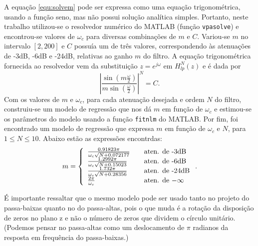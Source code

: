 A equação \ref{equ:solvem} pode ser expressa como uma equação trigonométrica, usando a função seno, mas não possui solução analítica simples. Portanto, neste trabalho utilizou-se o resolvedor numérico do MATLAB (função \texttt{vpasolve}) e encontrou-se valores de $\omega_c$ para diversas combinações de $m$ e $C$. Variou-se $m$ no intervalo $[2,200]$ e $C$ possuía um de três valores, correspondendo às atenuações de -3dB, -6dB e -24dB, relativas ao ganho $m$ do filtro. A equação trigonométrica fornecida ao resolvedor vem da substituição $z=e^{j\omega}$ em $H^N_{lp}(z)$ e é dada por
\begin{equation}
     \left|\frac{\sin \left(m\frac{\omega}{2}\right)} {m\sin\left(\frac{\omega}{2}\right)}\right|^N = C.
\end{equation}
Com os valores de $m$ e $\omega_c$, para cada atenuação desejada e ordem $N$ do filtro, construiu-se um modelo de regressão que nos dá $m$ em função de $\omega_c$ e estimou-se os parâmetros do modelo usando a função \texttt{fitnlm} do MATLAB. Por fim, foi encontrado um modelo de regressão que expressa $m$ em função de $\omega_c$ e $N$, para $1\leq N \leq 10$. Abaixo estão as expressões encontrdas:
\begin{equation}
     m = \left\{
     \begin{array}{l l}
         \frac{0.91823\pi}{\omega_c\sqrt{N+0.072177}} & \quad \text{aten. de -3dB}\\
         \frac{1.2992\pi}{\omega_c\sqrt{N+0.15023}} & \quad \text{aten. de -6dB}\\
         \frac{1.732\pi}{\omega_c\sqrt{N+0.28356}} & \quad \text{aten. de -24dB}\\
         \frac{2\pi}{\omega_c} & \quad \text{aten. de $-\infty$}
     \end{array} \right..
\end{equation}

É importante ressaltar que o mesmo modelo pode ser usado tanto no projeto do passa-baixas quanto no do passa-altas, pois o que muda é a rotação da disposição de zeros no plano z e não o número de zeros que dividem o círculo unitário. (Podemos pensar no passa-altas como um deslocamento de $\pi$ radianos da resposta em frequência do passa-baixas.)

